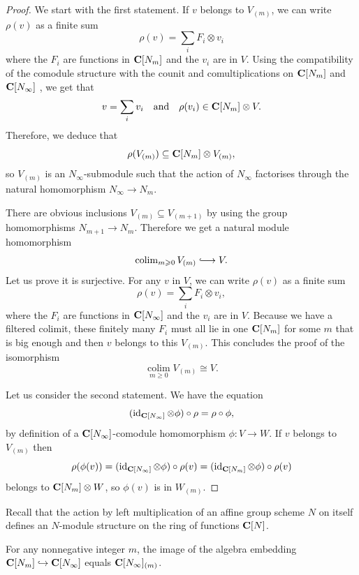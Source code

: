 \begin{proof}
	We start with the first statement. If $v$ belongs to $V_{(m)}$, we can write $\rho(v)$ as a finite sum
	\[ \rho(v) = \sum_i F_i \otimes v_i \]
	where the $F_i$ are functions in $\mathbf{C}[N_m]$ and the $v_i$ are in $V$. Using the compatibility of the comodule structure with the counit and comultiplications on $\mathbf{C}[N_m]$ and $\mathbf{C}[N_\infty]$ \cite[Formulae (24)]{milne2017algebraic}, we get that 
	\[ v = \sum_i v_i \quad \text{and} \quad \rho(v_i) \in \mathbf{C}[N_m] \otimes V. \]
	Therefore, we deduce that
	\[ \rho(V_{(m)}) \subseteq \mathbf{C}[N_m] \otimes V_{(m)}, \]
	so $V_{(m)}$ is an $N_\infty$-submodule such that the action of $N_\infty$ factorises through the natural homomorphism $N_\infty \rightarrow N_m$. 
	
	There are obvious inclusions $V_{(m)} \subseteq V_{(m+1)}$ by using the group homomorphisms $N_{m+1} \rightarrow N_m$. 
	Therefore we get a natural module homomorphism
	\[ \operatorname{colim}\limits_{m \geqslant 0} V_{(m)} \hooklongrightarrow V. \]
	Let us prove it is surjective. For any $v$ in $V$, we can write $\rho(v)$ as a finite sum
	\[ \rho(v) = \sum_i F_i \otimes v_i, \] 
	where the $F_i$ are functions in $\mathbf{C}[N_\infty]$ and the $v_i$ are in $V$. Because we have a filtered colimit, these finitely many $F_i$ must all lie in one $\mathbf{C}[N_m]$ for some $m$ that is big enough and then $v$ belongs to this $V_{(m)}$. This concludes the proof of the isomorphism
	\[ \operatorname{colim}\limits_{m \geqslant 0} V_{(m)} \cong V. \]
	
	Let us consider the second statement. We have the equation
	\[ (\operatorname{id}_{\mathbf{C}[N_\infty]} \otimes \phi) \circ \rho = \rho \circ \phi, \]
	by definition of a $\mathbf{C}[N_\infty]$-comodule homomorphism $\phi \colon V \rightarrow W$. If $v$ belongs to $V_{(m)}$ then 
	\[ \rho(\phi(v)) =  (\operatorname{id}_{\mathbf{C}[N_\infty]} \otimes \phi) \circ \rho(v) =  (\operatorname{id}_{\mathbf{C}[N_m]} \otimes \phi) \circ \rho(v) \]
	belongs to $\mathbf{C}[N_m] \otimes W$, so $\phi(v)$ is in $W_{(m)}$.
\end{proof}

Recall that the action by left multiplication of an affine group scheme $N$ on itself defines an $N$-module structure on the ring of functions $\mathbf{C}[N]$.

\begin{lemma} \label{lemma:filtration-function-progroup}
	For any nonnegative integer $m$, the image of the algebra embedding $\mathbf{C}[N_m] \hookrightarrow \mathbf{C}[N_\infty]$ equals $\mathbf{C}[N_\infty]_{(m)}$.
\end{lemma}

